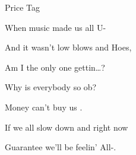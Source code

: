 \begin{SBSong}{Price Tag}
\begin{SBVerse}
    When music made us all U-
    
    And it wasn't low blows and  Hoes,
    
    Am I the only one gettin\ldots {}?
    
    Why is everybody so ob?
    
    Money can't buy us .
    
    If we all slow down and  right now
    
    Guarantee we'll be feelin' All-.
  \end{SBVerse}
  \begin{SBChorus*}
  \end{SBChorus*}
\end{SBSong}